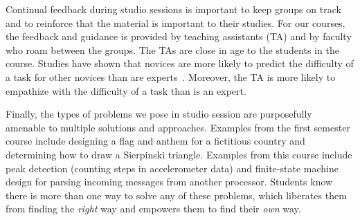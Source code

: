 Continual feedback during studio sessions is important to keep groups on
track and to reinforce that the material is important to
their studies.  For our courses, the feedback and guidance is provided by
teaching assistants (TA) and by faculty who 
roam between the groups.  The TAs are close in age to the students in the
course.
Studies have shown that novices are more likely to predict the difficulty
of a task for other novices than are experts~\cite{Hinds:1999}.  Moreover,
the TA is more likely to empathize with the difficulty of a task than is
an expert.


Finally, the types of problems we pose in studio session are purposefully
amenable to multiple solutions and approaches.  Examples from the
first semester course include designing
a flag and anthem for a fictitious country and
determining how to draw a Sierpinski triangle.
Examples from this course include peak detection (counting steps in
accelerometer data) and finite-state machine design for parsing
incoming messages from another processor.
Students know there is more than one way to solve any of these
problems, which liberates them from finding the \emph{right} way and
empowers them to find their \emph{own} way.

